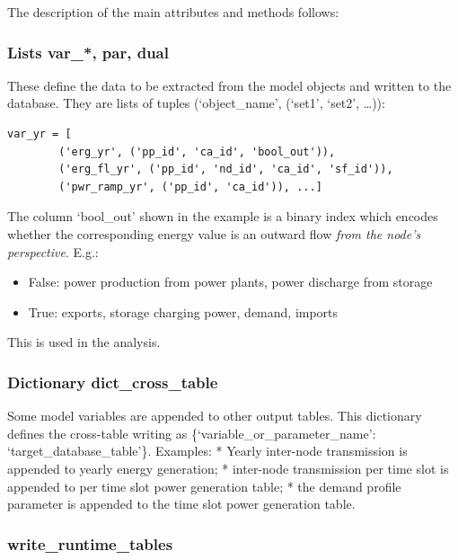 \documentclass[]{article}
\begin{document}
The description of the main attributes and methods follows:

\subsubsection{Lists var\_*, par, dual}\label{lists-varux5f-par-dual}

These define the data to be extracted from the model objects and written
to the database. They are lists of tuples (`object\_name', (`set1',
`set2', \ldots{})):

\begin{verbatim}
var_yr = [
		('erg_yr', ('pp_id', 'ca_id', 'bool_out')),
		('erg_fl_yr', ('pp_id', 'nd_id', 'ca_id', 'sf_id')),
		('pwr_ramp_yr', ('pp_id', 'ca_id')), ...]

\end{verbatim}

The column `bool\_out' shown in the example is a binary index which
encodes whether the corresponding energy value is an outward flow
\emph{from the node's perspective}. E.g.:
\begin{itemize}\itemsep0pt
	\item False: power production from power plants, power discharge from storage
	\item True: exports, storage charging power, demand, imports

\end{itemize}

This is used in the analysis.

\subsubsection{Dictionary
dict\_cross\_table}\label{dictionary-dictux5fcrossux5ftable}

Some model variables are appended to other output tables. This
dictionary defines the cross-table writing as
\{`variable\_or\_parameter\_name': `target\_database\_table'\}.
Examples: * Yearly inter-node transmission is appended to yearly energy
generation; * inter-node transmission per time slot is appended to per
time slot power generation table; * the demand profile parameter is
appended to the time slot power generation table.

\subsubsection{write\_runtime\_tables}\label{writeux5fruntimeux5ftables}
\end{document}
